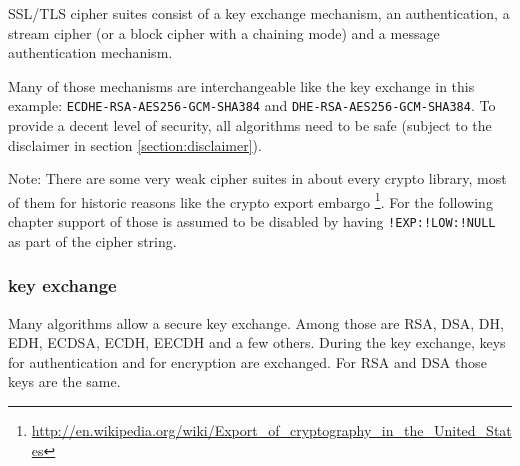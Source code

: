 \label{section:ChoosingYourOwnCipherSuites}


SSL/TLS cipher suites consist of a key exchange mechanism, an authentication, a
stream cipher (or a block cipher with a chaining mode) and a message authentication
mechanism.

Many of those mechanisms are interchangeable like the key exchange in this example:
\texttt{ECDHE-RSA-AES256-GCM-SHA384} and \texttt{DHE-RSA-AES256-GCM-SHA384}.
To provide a decent level of security, all algorithms need to be safe (subject to
the disclaimer in section \ref{section:disclaimer}).

Note: There are some very weak cipher suites in about every crypto library, most of
them for historic reasons like the crypto export embargo
\footnote{\url{http://en.wikipedia.org/wiki/Export_of_cryptography_in_the_United_States}}.
For the following chapter support of those is assumed to be disabled by having
\texttt{!EXP:!LOW:!NULL} as part of the cipher string.


\subsubsection{key exchange}

Many algorithms allow a secure key exchange. Among those are RSA, DSA, DH, EDH, ECDSA,
ECDH, EECDH and a few others. During the key exchange, keys for authentication and for
encryption are exchanged. For RSA and DSA those keys are the same.



